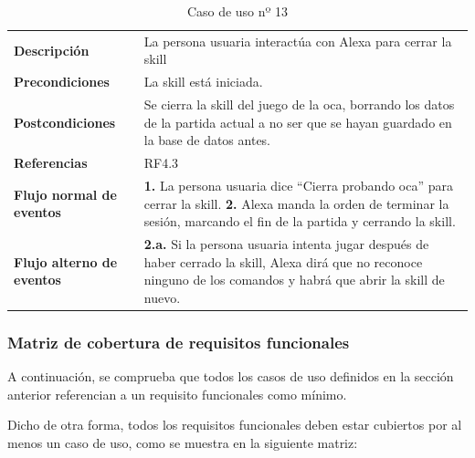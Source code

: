 \begin{table}[H]
	\centering
	\begin{tabular}{|p{3cm}|p{12cm}|}
		\hline
		\rowcolor{lightgray}
		\multicolumn{2}{|c|}{\textbf{CU13}: Cerrar la skill} \\
		\hline
		\textbf{Descripción} & La persona usuaria interactúa con Alexa para cerrar la skill \vspace{0.2cm} \\
		\hline
		\textbf{Precondiciones} & La skill está iniciada. \vspace{0.2cm} \\
		\hline
		\textbf{Postcondiciones} & Se cierra la skill del juego de la oca, borrando los datos de la partida actual a no ser que se hayan guardado en la base de datos antes. \vspace{0.2cm} \\
		\hline
		\textbf{Referencias} & RF4.3 \vspace{0.2cm} \\
		\hline
		\textbf{Flujo normal de eventos} &
		\textbf{1.} La persona usuaria dice \enquote{Cierra probando oca} para cerrar la skill. \newline
		\vspace{0.2cm}
		\textbf{2.} Alexa manda la orden de terminar la sesión, marcando el fin de la partida y cerrando la skill.
		\vspace{0.2cm} \\
		\hline
		\textbf{Flujo alterno de eventos} &
		\textbf{2.a.} Si la persona usuaria intenta jugar después de haber cerrado la skill, Alexa dirá que no reconoce ninguno de los comandos y habrá que abrir la skill de nuevo. \vspace{0.2cm} \\
		\hline
	\end{tabular}
	\caption{Caso de uso nº 13}
	\label{tab:CU13}
\end{table}

\newpage
\subsubsection{Matriz de cobertura de requisitos funcionales}

A continuación, se comprueba que todos los casos de uso definidos en la sección anterior referencian a un requisito funcionales como mínimo. 

Dicho de otra forma, todos los requisitos funcionales deben estar cubiertos por al menos un caso de uso, como se muestra en la siguiente matriz:

